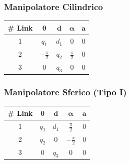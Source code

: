 \documentclass[11pt, a4paper]{report}
\begin{document}
\begin{minipage}[t]{0.48\textwidth}
    \subsubsection*{Manipolatore Cilindrico}
    \centering
    \begin{tabular}{|c|c|c|c|c|}
        \hline
        \textbf{\# Link} & \(\boldsymbol{\theta}\) & \(\boldsymbol{d}\) & \(\boldsymbol{\alpha}\) & \(\boldsymbol{a}\) \\
        \hline
        1 & \(q_{1}\) & \(d_{1}\) & 0 & 0 \\
        \hline
        2 & \(-\frac{\pi}{2}\) & \(q_{2}\) & \(\frac{\pi}{2}\) & 0\\
        \hline
        3 & 0 & \(q_{3}\) & 0 & 0 \\
        \hline
    \end{tabular}

\end{minipage}
\hfill
\begin{minipage}[t]{0.48\textwidth}
    \subsubsection*{Manipolatore Sferico (Tipo I)}
    \centering
    \begin{tabular}{|c|c|c|c|c|}
        \hline
        \textbf{\# Link} & \(\boldsymbol{\theta}\) & \(\boldsymbol{d}\) & \(\boldsymbol{\alpha}\) & \(\boldsymbol{a}\) \\
        \hline
        1 & \(q_{1}\) & \(d_{1}\) & \(\frac{\pi}{2}\) & 0 \\
        \hline
        2 & \(q_{2}\) & 0 & \(-\frac{\pi}{2}\) & 0\\
        \hline
        3 & 0 & \(q_{3}\) & 0 & 0 \\
        \hline
    \end{tabular}
\end{minipage}

\vspace{1cm} %
\end{document}

